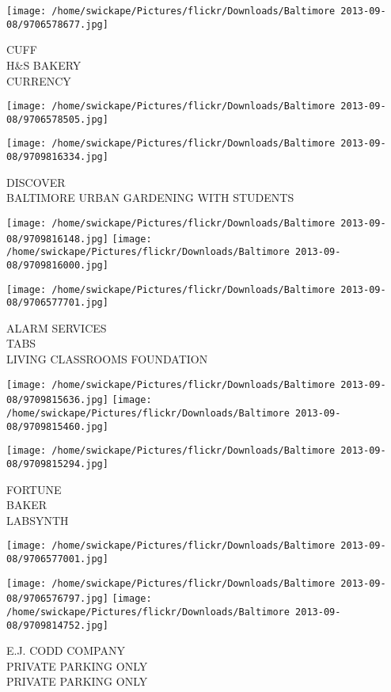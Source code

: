 \documentclass[10pt,letterpaper]{article}
\begin{document}
\texttt{[image: /home/swickape/Pictures/flickr/Downloads/Baltimore 2013-09-08/9706578677.jpg]}

CUFF\\
H\&S BAKERY\\
CURRENCY
\pagebreak

\texttt{[image: /home/swickape/Pictures/flickr/Downloads/Baltimore 2013-09-08/9706578505.jpg]}

\vspace{0.25in}
\texttt{[image: /home/swickape/Pictures/flickr/Downloads/Baltimore 2013-09-08/9709816334.jpg]}

DISCOVER\\
BALTIMORE URBAN GARDENING WITH STUDENTS
\pagebreak

\texttt{[image: /home/swickape/Pictures/flickr/Downloads/Baltimore 2013-09-08/9709816148.jpg]}
\texttt{[image: /home/swickape/Pictures/flickr/Downloads/Baltimore 2013-09-08/9709816000.jpg]}

\vspace{0.25in}
\texttt{[image: /home/swickape/Pictures/flickr/Downloads/Baltimore 2013-09-08/9706577701.jpg]}

ALARM SERVICES\\
TABS\\
LIVING CLASSROOMS FOUNDATION
\pagebreak

\texttt{[image: /home/swickape/Pictures/flickr/Downloads/Baltimore 2013-09-08/9709815636.jpg]}
\texttt{[image: /home/swickape/Pictures/flickr/Downloads/Baltimore 2013-09-08/9709815460.jpg]}

\texttt{[image: /home/swickape/Pictures/flickr/Downloads/Baltimore 2013-09-08/9709815294.jpg]}

FORTUNE\\
BAKER\\
LABSYNTH
\pagebreak

\texttt{[image: /home/swickape/Pictures/flickr/Downloads/Baltimore 2013-09-08/9706577001.jpg]}

\vspace{0.25in}
\texttt{[image: /home/swickape/Pictures/flickr/Downloads/Baltimore 2013-09-08/9706576797.jpg]}
\texttt{[image: /home/swickape/Pictures/flickr/Downloads/Baltimore 2013-09-08/9709814752.jpg]}

E.J. CODD COMPANY\\
PRIVATE PARKING ONLY\\
PRIVATE PARKING ONLY
\pagebreak
\end{document}
